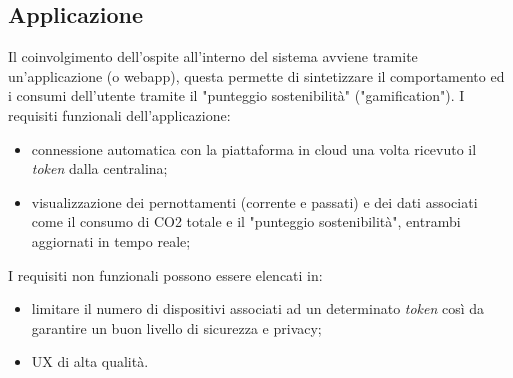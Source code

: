\subsection{Applicazione}
Il coinvolgimento dell'ospite all'interno del sistema avviene tramite un'applicazione (o webapp), questa permette di sintetizzare il comportamento ed i consumi dell'utente tramite il "punteggio sostenibilità" ("gamification").\newline
%
I requisiti funzionali dell'applicazione:
\begin{itemize}
    \item connessione automatica con la piattaforma in cloud una volta ricevuto il \textit{token} dalla centralina;
    \item visualizzazione dei pernottamenti (corrente e passati) e dei dati associati come il consumo di CO2 totale e il "punteggio sostenibilità", entrambi aggiornati in tempo reale;
\end{itemize}
%
I requisiti non funzionali possono essere elencati in:
\begin{itemize}
    \item limitare il numero di dispositivi associati ad un determinato \textit{token} così da garantire un buon livello di sicurezza e privacy;
    \item UX di alta qualità.
\end{itemize}
%
